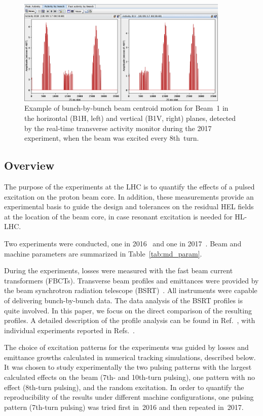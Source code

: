 \documentclass[aps
,prstab
,reprint
,longbibliography
,preprintnumbers
,showkeys
,amsfonts,amssymb,amsmath
,floatfix
]{revtex4-1}
\newcommand{\seventhtp}{7th-turn pulsing}
\newcommand{\eighthtp}{8th-turn pulsing}
\newcommand{\tenthtp}{10th-turn pulsing}
\begin{document}
\begin{figure}
  \includegraphics[width=0.9\textwidth]{bunchfilling_measured.png}	
  \caption{Example of bunch-by-bunch beam centroid motion for Beam~1
    in the horizontal (B1H, left) and vertical (B1V, right) planes,
    detected by the real-time transverse activity monitor during the
    2017 experiment, when the beam was excited every 8th~turn.}
  \label{fig:fill_meas} 
\end{figure}

\subsection{Overview}
\label{sec:exp_sum}

The purpose of the experiments at the LHC is to quantify the effects
of a pulsed excitation on the proton beam core. In addition, these
measurements provide an experimental basis to guide the design and
tolerances on the residual HEL fields at the location of the beam
core, in case resonant excitation is needed for HL-LHC.

Two experiments were conducted, one in 2016~\cite{resexmd2016} and one
in 2017~\cite{resexmd2017}. Beam and machine parameters are summarized
in Table~\ref{tab:md_param}.

During the experiments, losses were measured with the fast beam
current transformers (FBCTs). Transverse beam profiles and emittances
were provided by the beam synchrotron radiation telescope
(BSRT)~\cite{Trad:PhD:2015}. All instruments were capable of
delivering bunch-by-bunch data. The data analysis of the BSRT profiles
is quite involved. In this paper, we focus on the direct comparison of
the resulting profiles. A detailed description of the profile analysis
can be found in Ref.~\cite{bsrtprofinj}, with individual experiments
reported in Refs.~\cite{resexmd2016, resexmd2017}.

The choice of excitation patterns for the experiments was guided by
losses and emittance growths calculated in numerical tracking
simulations, described below. It was chosen to study experimentally
the two pulsing patterns with the largest calculated effects on the
beam (7th- and \tenthtp), one pattern with no effect (\eighthtp), and
the random excitation. In order to quantify the reproducibility of the
results under different machine configurations, one pulsing pattern
(\seventhtp) was tried first in~2016 and then repeated in~2017.
\end{document}
